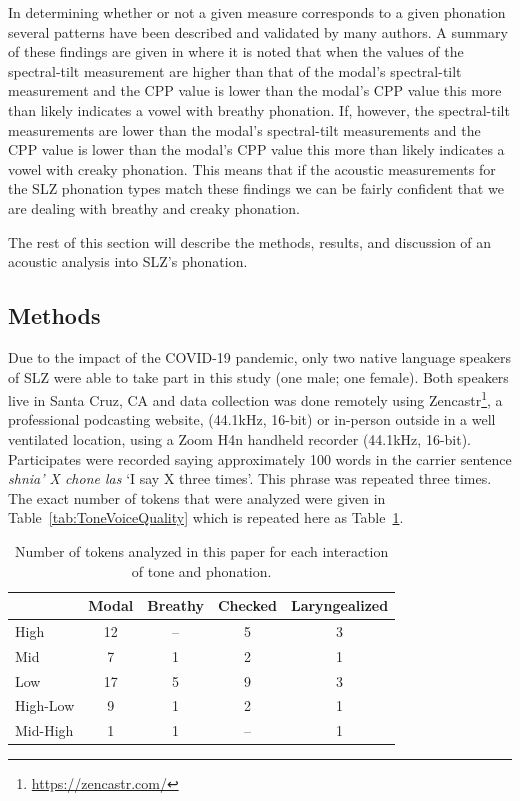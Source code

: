 \documentclass[12pt, letterpaper]{article}
\providecommand{\lsptoprule}{\midrule\toprule}
\providecommand{\lspbottomrule}{\bottomrule\midrule}
\begin{document}
In determining whether or not a given measure corresponds to a given phonation several patterns have been described and validated by many authors. A summary of these findings are given in \citet{garellekPhoneticsVoice2019} where it is noted that when the values of the spectral-tilt measurement are higher than that of the modal's spectral-tilt measurement and the CPP value is lower than the modal's CPP value this more than likely indicates a vowel with breathy phonation. If, however, the spectral-tilt measurements are lower than the modal's spectral-tilt measurements and the CPP value is lower than the modal's CPP value this more than likely indicates a vowel with creaky phonation. This means that if the acoustic measurements for the SLZ phonation types match these findings we can be fairly confident that we are dealing with breathy and creaky phonation. 

The rest of this section will describe the methods, results, and discussion of an acoustic analysis into SLZ's phonation. 

\subsection{Methods} \label{sec:Methods}

Due to the impact of the COVID-19 pandemic, only two native language speakers of SLZ were able to take part in this study (one male; one female). Both speakers live in Santa Cruz, CA and data collection was done remotely using Zencastr\footnote{\href{https://zencastr.com/}{https://zencastr.com/}}, a professional podcasting website, (44.1kHz, 16-bit) or in-person outside in a well ventilated location, using a Zoom H4n handheld recorder (44.1kHz, 16-bit). Participates were recorded saying approximately 100 words in the carrier sentence \textit{shnia' X chone las} `I say X three times'. This phrase was repeated three times. The exact number of tokens that were analyzed were given in Table~\ref{tab:ToneVoiceQuality} which is repeated here as Table~\ref{tab:Interaction}. 

\begin{table}[!h]
	\caption{Number of tokens analyzed in this paper for each interaction of tone and phonation.}
	\label{tab:Interaction}
	\centering

	\begin{tabular}{lcccc}
	\lsptoprule
		& \textbf{Modal} & \textbf{Breathy} & \textbf{Checked} & \textbf{Laryngealized} \\
	\hline
	High		& 12 & -- & 5	& 3 \\
	Mid			& 7 & 1  & 2	& 1 \\
	Low			& 17 & 5  & 9	& 3 \\
	High-Low	& 9 & 1  & 2	& 1 \\
	Mid-High	& 1	 & 1  & --	& 1 \\
	\lspbottomrule
	\end{tabular}
\end{table}
\end{document}
